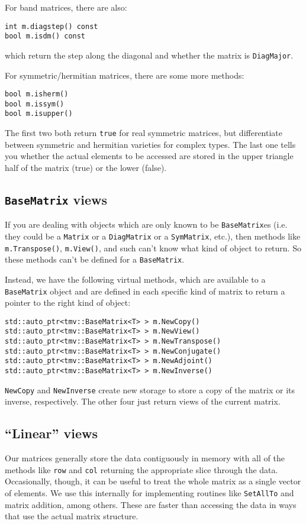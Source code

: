 \documentclass[twoside,letterpaper,11pt]{article}
\renewcommand{\tt}[1]{{\texttt {#1}}}
\begin{document}
For band matrices, there are also:
\begin{verbatim}
int m.diagstep() const
bool m.isdm() const
\end{verbatim}
which return the step along the diagonal and whether the matrix is \tt{DiagMajor}.

For symmetric/hermitian matrices, there are some more methods:
\begin{verbatim}
bool m.isherm()
bool m.issym()
bool m.isupper()
\end{verbatim}
The first two both return \tt{true} for real symmetric matrices, but 
differentiate between symmetric and hermitian varieties for complex types.
The last one tells you whether the actual elements to be accessed are stored
in the upper triangle half of the matrix (true) or the lower (false).

\subsection{\tt{BaseMatrix} views}

If you are dealing with objects which are only known to be \tt{BaseMatrix}es
(i.e. they could be a \tt{Matrix} or a \tt{DiagMatrix} or a \tt{SymMatrix}, etc.),
then methods like \tt{m.Transpose()}, \tt{m.View()}, and such
can't know what kind of object to return.
So these methods can't be defined for a \tt{BaseMatrix}.  

Instead, we have the following virtual methods, 
which are available to a \tt{BaseMatrix}
object and are defined in each specific kind of matrix to return a pointer
to the right kind of object:
\begin{verbatim}
std::auto_ptr<tmv::BaseMatrix<T> > m.NewCopy()
std::auto_ptr<tmv::BaseMatrix<T> > m.NewView()
std::auto_ptr<tmv::BaseMatrix<T> > m.NewTranspose()
std::auto_ptr<tmv::BaseMatrix<T> > m.NewConjugate()
std::auto_ptr<tmv::BaseMatrix<T> > m.NewAdjoint()
std::auto_ptr<tmv::BaseMatrix<T> > m.NewInverse()
\end{verbatim}
\tt{NewCopy} and \tt{NewInverse} create new storage to store a copy of the 
matrix or its inverse, respectively.  The other four just return views of the current 
matrix.

\subsection{``Linear'' views}

Our matrices generally store the data contiguously in memory with all of the 
methods like \tt{row} and \tt{col} returning the appropriate slice through the
data.  Occasionally, though, it can be useful to treat the whole matrix
as a single vector of elements.  We use this internally for implementing routines
like \tt{SetAllTo} and matrix addition, among others.  These are faster than
accessing the data in ways that use the actual matrix structure.
\end{document}
